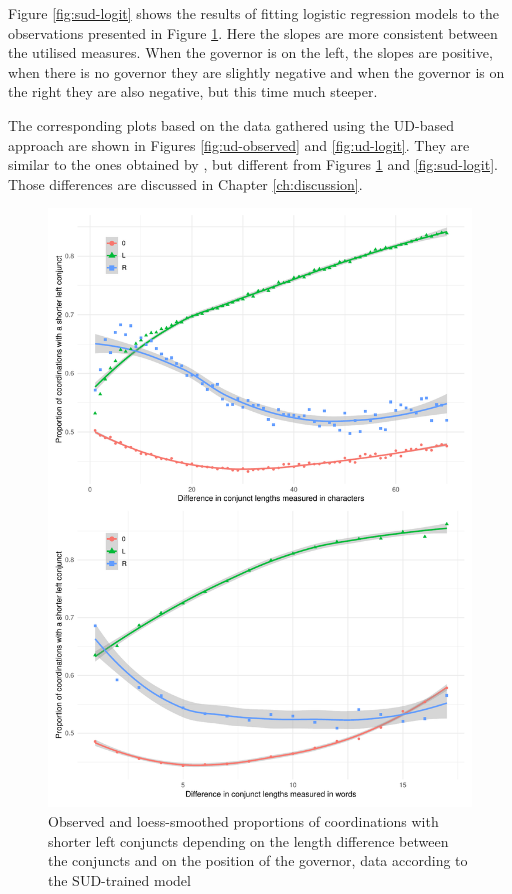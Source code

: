 Figure \ref{fig:sud-logit} shows the results of fitting logistic regression models to the observations presented in Figure \ref{fig:sud-observed}. Here the slopes are more consistent between the utilised measures. When the governor is on the left, the slopes are positive, when there is no governor they are slightly negative and when the governor is on the right they are also negative, but this time much steeper. 

The corresponding plots based on the data gathered using the UD-based approach are shown in Figures \ref{fig:ud-observed} and \ref{fig:ud-logit}. They are similar to the ones obtained by \cite{prz:etal:24}, but different from Figures \ref{fig:sud-observed} and \ref{fig:sud-logit}. Those differences are discussed in Chapter \ref{ch:discussion}. 

\begin{figure}[hbt!]
    \includegraphics[width=\textwidth]{inputs/sud-observed.pdf}
    \caption{\centering Observed and loess-smoothed proportions of coordinations with shorter left conjuncts depending on the length difference between the conjuncts and on the position of the governor, data according to the SUD-trained model}\label{fig:sud-observed}
\end{figure}


